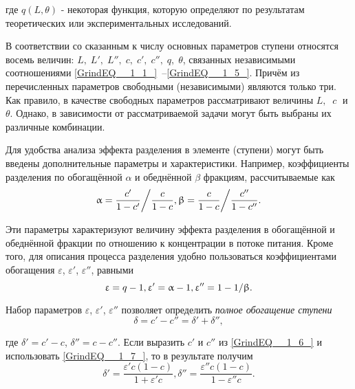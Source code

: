 где $q(L,\theta )$ - некоторая функция, которую определяют по результатам теоретических или экспериментальных исследований.

В соответствии со сказанным к числу основных параметров ступени относятся восемь величин: $L,\; L',\; L'',\; c,\; c',\; c'',\; q,\; \theta $, связанных независимыми соотношениями \ref{GrindEQ__1_1_}~--\ref{GrindEQ__1_5_}. Причём из перечисленных параметров свободными (независимыми) являются только три. Как правило, в качестве свободных параметров рассматривают величины $L,\; \; c\; $ и $\theta $. Однако, в зависимости от рассматриваемой задачи могут быть выбраны их различные комбинации.

Для удобства анализа эффекта разделения в элементе (ступени) могут быть введены дополнительные параметры и характеристики. Например, коэффициенты разделения по обогащённой $\alpha $ и обеднённой $\beta $ фракциям, рассчитываемые как
\begin{equation} \label{GrindEQ__1_6_} 
\alpha ={\frac{c'}{1-c'}  \mathord{\left/{\vphantom{\frac{c'}{1-c'}  \frac{c}{1-c} }}\right.\kern-\nulldelimiterspace} \frac{c}{1-c} }  , \beta ={\frac{c}{1-c}  \mathord{\left/{\vphantom{\frac{c}{1-c}  \frac{c''}{1-c''} }}\right.\kern-\nulldelimiterspace} \frac{c''}{1-c''} } .        
\end{equation} 

Эти параметры характеризуют величину эффекта разделения в обогащённой и обеднённой фракции по отношению к концентрации в потоке питания. Кроме того, для описания процесса разделения удобно пользоваться коэффициентами обогащения $\varepsilon $, $\varepsilon '$, $\varepsilon ''$, равными
\begin{equation} \label{GrindEQ__1_7_} 
\varepsilon =q-1, \varepsilon '=\alpha -1, \varepsilon ''=1-{1 \mathord{\left/{\vphantom{1 \beta }}\right.\kern-\nulldelimiterspace} \beta } .             
\end{equation} 

Набор параметров $\varepsilon $, $\varepsilon '$, $\varepsilon ''$ позволяет определить \textit{полное обогащение ступени}
\begin{equation} \label{GrindEQ__1_8_} 
\delta =c'-c''=\delta '+\delta '',                          
\end{equation} 

где $\delta '=c'-c$, $\delta ''=c-c''$. Если выразить $c'$ и $c''$ из \ref{GrindEQ__1_6_} и использовать \ref{GrindEQ__1_7_}, то в результате получим
\begin{equation} \label{GrindEQ__1_9_} 
\delta '=\frac{\varepsilon 'c(1-c)}{1+\varepsilon 'c}  ,  \delta ''=\frac{\varepsilon ''c(1-c)}{1-\varepsilon ''c} .              
\end{equation} 

